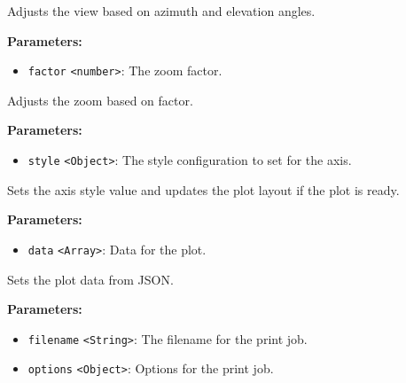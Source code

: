 \documentclass[12pt,a4paper]{article}
\begin{document}
\noindent Adjusts the view based on azimuth and elevation angles.

\vspace{5mm}
\noindent {}


\noindent \textbf{Parameters:}
\begin{itemize}
  \item \texttt{factor} \texttt{<number>}: The zoom factor.
\end{itemize}

\noindent Adjusts the zoom based on factor.

\vspace{5mm}
\noindent {}


\noindent \textbf{Parameters:}
\begin{itemize}
  \item \texttt{style} \texttt{<Object>}: The style configuration to set for the axis.
\end{itemize}

\noindent Sets the axis style value and updates the plot layout if the plot is ready.

\vspace{5mm}
\noindent {}


\noindent \textbf{Parameters:}
\begin{itemize}
  \item \texttt{data} \texttt{<Array>}: Data for the plot.
\end{itemize}

\noindent Sets the plot data from JSON.

\vspace{5mm}
\noindent {}


\noindent \textbf{Parameters:}
\begin{itemize}
  \item \texttt{filename} \texttt{<String>}: The filename for the print job.
  \item \texttt{options} \texttt{<Object>}: Options for the print job.
\end{itemize}
\end{document}
